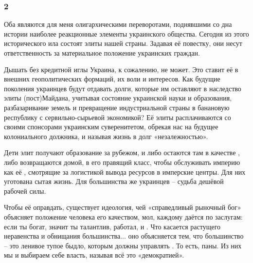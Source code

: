  
 
 
 
 
\subsubsection{2}

Оба  являются для меня олигархическими переворотами, поднявшими со дна
истории наиболее реакционные элементы украинского общества. Сегодня из этого
исторического ила состоят элиты нашей страны. Задавая её повестку, они несут
ответственность за материальное положение украинских граждан. 

Дышать без кредитной иглы Украина, к сожалению, не может. Это ставит её в
 внешних геополитических формаций, их воли и
интересов. Как будущие поколения украинцев будут отдавать долги, которые им
оставляют в наследство элиты (пост)Майдана, учитывая состояние украинской науки
и образования, разбазаривание земель и превращение индустриальной страны в
банановую республику с сервильно-сырьевой экономикой? Её элиты расплачиваются
со своими спонсорами украинским суверенитетом, обрекая нас на будущее
колониального должника, и называя жизнь в долг «незалежностью».

Дети элит получают образование за рубежом, и либо остаются там в качестве
, либо возвращаются домой, в его правящий класс, чтобы
обслуживать империю как её , смотрящие за логистикой
вывода ресурсов в имперские центры. Для них уготована сытая жизнь. Для
большинства же украинцев – судьба дешёвой рабочей силы. 

Чтобы её оправдать, существует идеология, чей «справедливый рыночный бог»
объясняет положение человека его качеством, мол, каждому даётся по заслугам:
если ты богат, значит ты талантлив, работал, и . Что касается растущего
неравенства и обнищания большинства... оно объясняется тем, что большинство – это
ленивое тупое быдло, которым должны управлять . То есть, паны. Из них мы и выбираем себе власть, называя всё
это «демократией».
